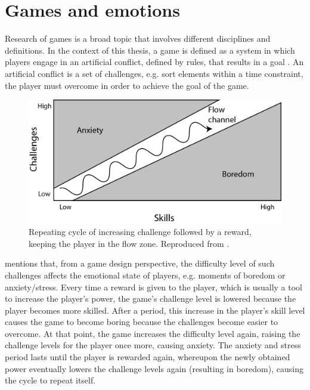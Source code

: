 \chapter{Games and emotions}
\label{ch:literature-games}

Research of games is a broad topic that involves different disciplines and definitions. In the context of this thesis, a game is defined as a system in which players engage in an artificial conflict, defined by rules, that results in a goal \parencite{salen2004rules}. An artificial conflict is a set of challenges, e.g. sort elements within a time constraint, the player must overcome in order to achieve the goal of the game.

\begin{figure}[h!]
    \centering
    \includegraphics[scale=0.8]{Content/figures/flow-schell.png}
    \caption{Repeating cycle of increasing challenge followed by a reward, keeping the player in the flow zone. Reproduced from \textcite{schell2014art}.}
    \label{fig:flow-schell}
\end{figure}

\textcite{schell2014art} mentions that, from a game design perspective, the difficulty level of such challenges affects the emotional state of players, e.g. moments of boredom or anxiety/stress. Every time a reward is given to the player, which is usually a tool to increase the player's power, the game's challenge level is lowered because the player becomes more skilled. After a period, this increase in the player's skill level causes the game to become boring because the challenges become easier to overcome. At that point, the game increases the difficulty level again, raising the challenge levels for the player once more, causing anxiety. The anxiety and stress period lasts until the player is rewarded again, whereupon the newly obtained power eventually lowers the challenge levels again (resulting in boredom), causing the cycle to repeat itself.

